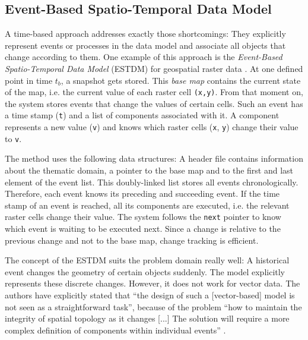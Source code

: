 \subsection{Event-Based Spatio-Temporal Data Model} %
\label{sub:event_based_spatio_temporal_data_model}

A time-based approach addresses exactly those shortcomings: They explicitly represent events or processes in the data model and associate all objects that change according to them. One example of this approach is the \emph{Event-Based Spatio-Temporal Data Model} (ESTDM) for geospatial raster data
\cite{peuquet95}. At one defined point in time $t_b$, a snapshot gets stored. This \emph{base map} contains the current state of the map, i.e. the current value of each raster cell \texttt{(x,y)}. From that moment on, the system stores events that change the values of certain cells. Such an event has a time stamp (\texttt{t}) and a list of components associated with it. A component represents a new value (\texttt{v}) and knows which raster cells (\texttt{x}, \texttt{y}) change their value to \texttt{v}.

The method uses the following data structures: A header file contains information about the thematic domain, a pointer to the base map and to the first and last element of the event list. This doubly-linked list stores all events chronologically. Therefore, each event knows its preceding and succeeding event. If the time stamp of an event is reached, all its components are executed, i.e. the relevant raster cells change their value. The system follows the \texttt{next} pointer to know which event is waiting to be executed next. Since a change is relative to the previous change and not to the base map, change tracking is efficient.

The concept of the ESTDM suits the problem domain really well: A historical event changes the geometry of certain objects suddenly. The model explicitly represents these discrete changes. However, it does not work for vector data. The authors have explicitly stated that ``the design of such a [vector-based] model is not seen as a straightforward task'', because of the problem ``how to maintain the integrity of spatial topology as it changes [...] The solution will require a more complex definition of components within individual events''
\cite[p. 21]{peuquet95}.


